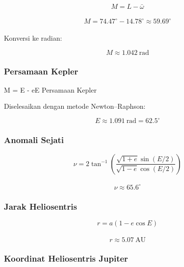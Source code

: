 {\setlength{\abovedisplayskip}{8pt}%
\setlength{\belowdisplayskip}{8pt}%
\[
M = L - \bar{\omega}
\]
}\\

{\setlength{\abovedisplayskip}{8pt}%
\setlength{\belowdisplayskip}{8pt}%
\[
M = 74.47^\circ - 14.78^\circ
\approx 59.69^\circ
\]
}\\

Konversi ke radian:

{\setlength{\abovedisplayskip}{8pt}%
\setlength{\belowdisplayskip}{8pt}%
\[
M \approx 1.042\ \text{rad}
\]
}
\subsubsection*{Persamaan Kepler}

\begin{equationcaptioned}{
M = E - e\sin E
}{
Persamaan Kepler
}
\end{equationcaptioned}

Diselesaikan dengan metode Newton–Raphson:

{\setlength{\abovedisplayskip}{8pt}%
\setlength{\belowdisplayskip}{8pt}%
\[
E \approx 1.091\ \text{rad}
= 62.5^\circ
\]
}


\subsubsection*{Anomali Sejati}

{\setlength{\abovedisplayskip}{8pt}%
\setlength{\belowdisplayskip}{8pt}%
\[
\nu =
2 \tan^{-1}
\left(
\frac{\sqrt{1+e}\sin(E/2)}
{\sqrt{1-e}\cos(E/2)}
\right)
\]
}\\

{\setlength{\abovedisplayskip}{8pt}%
\setlength{\belowdisplayskip}{8pt}%
\[
\nu \approx 65.6^\circ
\]
}


\subsubsection*{Jarak Heliosentris}

{\setlength{\abovedisplayskip}{8pt}%
\setlength{\belowdisplayskip}{8pt}%
\[
r = a(1 - e\cos E)
\]
}\\

{\setlength{\abovedisplayskip}{8pt}%
\setlength{\belowdisplayskip}{8pt}%
\[
r \approx 5.07\ \text{AU}
\]
}


\subsubsection*{Koordinat Heliosentris Jupiter}

